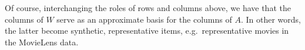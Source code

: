 Of course, interchanging the roles of rows and columns above, we have
that the columns of $W$ serve as an approximate basis for the columns of
$A$.  In other words, the latter become synthetic, representative items,
e.g.\ representative movies in the MovieLens data.

% 
% 

